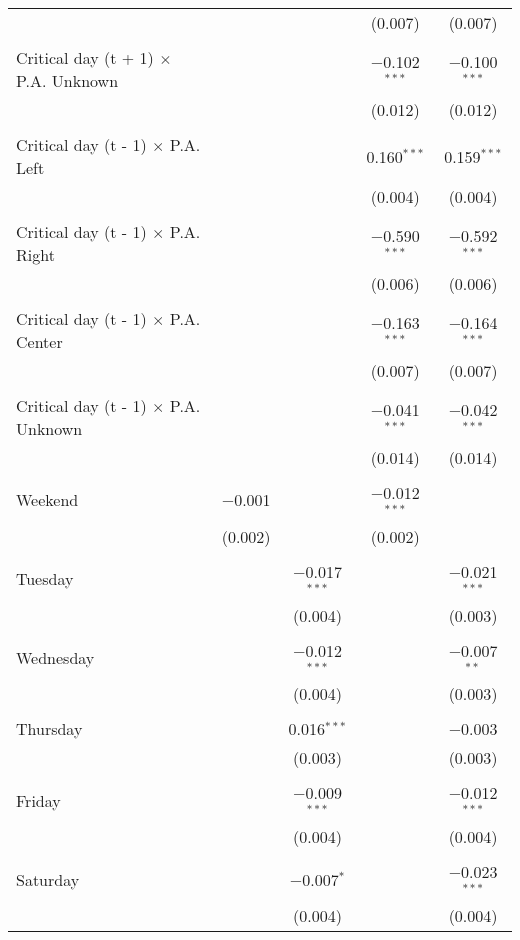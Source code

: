 \documentclass[
]{article}
\begin{document}
\begin{table}[!htbp]
{\begin{tabular}{@{\extracolsep{5pt}}lcccc}
  &  &  & (0.007) & (0.007) \\ 
  & & & & \\ 
 Critical day (t + 1) $\times$ P.A. Unknown &  &  & $-$0.102$^{***}$ & $-$0.100$^{***}$ \\ 
  &  &  & (0.012) & (0.012) \\ 
  & & & & \\ 
 Critical day (t - 1) $\times$ P.A. Left &  &  & 0.160$^{***}$ & 0.159$^{***}$ \\ 
  &  &  & (0.004) & (0.004) \\ 
  & & & & \\ 
 Critical day (t - 1) $\times$ P.A. Right &  &  & $-$0.590$^{***}$ & $-$0.592$^{***}$ \\ 
  &  &  & (0.006) & (0.006) \\ 
  & & & & \\ 
 Critical day (t - 1) $\times$ P.A. Center &  &  & $-$0.163$^{***}$ & $-$0.164$^{***}$ \\ 
  &  &  & (0.007) & (0.007) \\ 
  & & & & \\ 
 Critical day (t - 1) $\times$ P.A. Unknown &  &  & $-$0.041$^{***}$ & $-$0.042$^{***}$ \\ 
  &  &  & (0.014) & (0.014) \\ 
  & & & & \\ 
 Weekend & $-$0.001 &  & $-$0.012$^{***}$ &  \\ 
  & (0.002) &  & (0.002) &  \\ 
  & & & & \\ 
 Tuesday &  & $-$0.017$^{***}$ &  & $-$0.021$^{***}$ \\ 
  &  & (0.004) &  & (0.003) \\ 
  & & & & \\ 
 Wednesday &  & $-$0.012$^{***}$ &  & $-$0.007$^{**}$ \\ 
  &  & (0.004) &  & (0.003) \\ 
  & & & & \\ 
 Thursday &  & 0.016$^{***}$ &  & $-$0.003 \\ 
  &  & (0.003) &  & (0.003) \\ 
  & & & & \\ 
 Friday &  & $-$0.009$^{***}$ &  & $-$0.012$^{***}$ \\ 
  &  & (0.004) &  & (0.004) \\ 
  & & & & \\ 
 Saturday &  & $-$0.007$^{*}$ &  & $-$0.023$^{***}$ \\ 
  &  & (0.004) &  & (0.004) \\ 

\end{tabular}}
\end{table}
\end{document}
